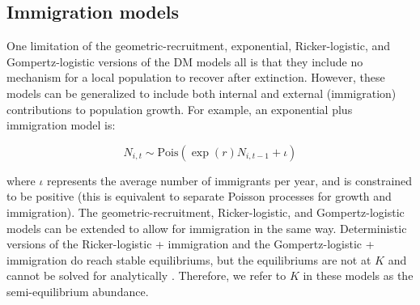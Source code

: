 \documentclass[12pt,english]{article}
\begin{document}
\begin{spacing}{1.9}
\begin{flushleft}
\subsection*{Immigration models}

One limitation of the geometric-recruitment, exponential,
Ricker-logistic, and Gompertz-logistic versions of the DM models all
is that they include no mechanism for a local population to recover
after extinction. %
However, these models can be generalized 
to include both internal and external (immigration) contributions
to population growth. For example, an exponential plus immigration
model is:
\begin{linenomath*}
\begin{equation}
  N_{i,t} \sim \mathrm{Pois}(\exp(r)N_{i,t-1} + \iota)
  \label{eq:expimm2}
\end{equation}
\end{linenomath*}
where $\iota$ represents the average number of immigrants per year, and is
constrained to be
positive (this is equivalent to separate Poisson processes for
growth and immigration).  %
The geometric-recruitment, Ricker-logistic,
and Gompertz-logistic models can be extended to allow for immigration in the
same way.   Deterministic versions of the Ricker-logistic + immigration and the 
Gompertz-logistic + immigration do reach stable equilibriums, but the equilibriums 
are not at $K$ and cannot be solved for analytically \citep{otto_day:2007}.  Therefore, we
refer to $K$ in these models as the semi-equilibrium abundance.

\end{flushleft}
\end{spacing}
\end{document}
